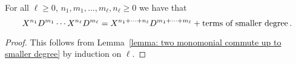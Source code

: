 \begin{corollary}
  \label{corollary: multiple monomials commute up to smaller degree}
  For all $\ell \geq 0$, $n_1, m_1, \dotsc, m_\ell, n_\ell \geq 0$ we have that
  \[
      X^{n_1} D^{m_1} \dotsm X^{n_\ell} D^{m_\ell}  \\
    = X^{n_1 + \dotsb + n_\ell} D^{m_1 + \dotsb + m_\ell}
      + \text{terms of smaller degree} \,.
  \]
\end{corollary}


\begin{proof}
  This follows from Lemma~\ref{lemma: two monomonial commute up to smaller degree} by induction on $\ell$.
\end{proof}


% 


